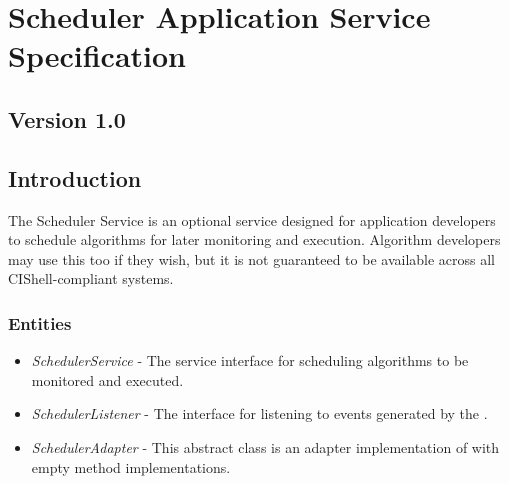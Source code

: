 %

\chapter{Scheduler Application Service Specification}

\section*{Version 1.0}

\section{Introduction}

The Scheduler Service is an optional service designed for application developers
to schedule algorithms for later monitoring and execution. Algorithm developers
may use this too if they wish, but it is not guaranteed to be available across
all CIShell-compliant systems.

\subsection{Entities}

\begin{itemize}
  \item \textit{SchedulerService} - The service interface for scheduling
  algorithms to be monitored and executed.
  \item \textit{SchedulerListener} - The interface for listening to events
  generated by the .
  \item \textit{SchedulerAdapter} - This abstract class is an adapter
  implementation of  with empty method
  implementations.
\end{itemize}

\orgcishellappservicescheduler{}
